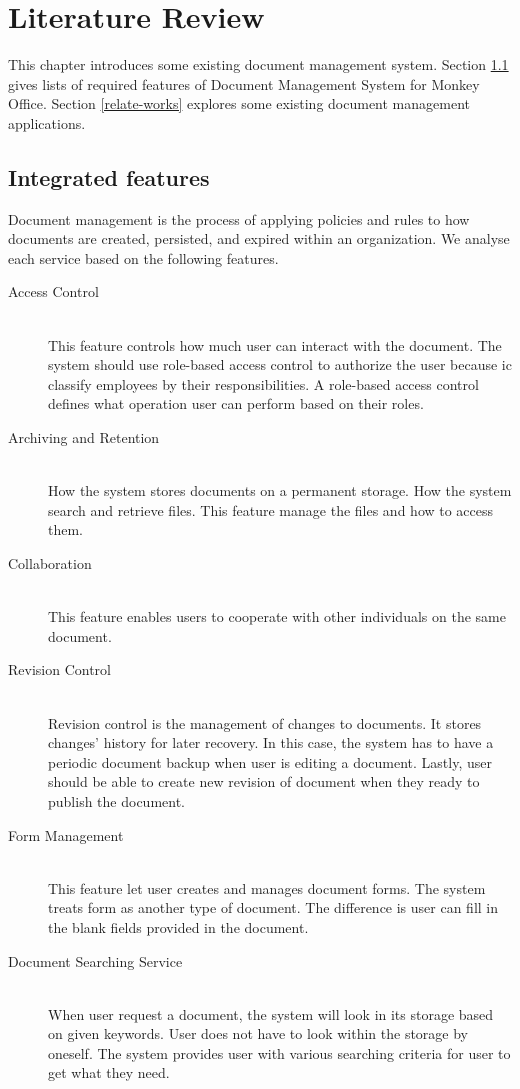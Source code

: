 \chapter{Literature Review}
This chapter introduces some existing document management system.
Section \ref{dms-features} gives lists of required features of Document Management System for Monkey Office.
Section \ref{relate-works} explores some existing document management applications.

\section{Integrated features} \label{dms-features}
Document management is the process of applying policies and rules to how documents are created, persisted, and expired within an organization.
We analyse each service based on the following features.

\begin{description}
\item[Access Control] \hfill \\
This feature controls how much user can interact with the document.
The system should use role-based access control to authorize the user because \gls{ic} classify employees by their responsibilities.
A role-based access control defines what operation user can perform based on their roles.

\item[Archiving and Retention] \hfill \\
How the system stores documents on a permanent storage.
How the system search and retrieve files.
This feature manage the files and how to access them.

\item[Collaboration] \hfill \\
This feature enables users to cooperate with other individuals on the same document. 


\item[Revision Control] \hfill \\
Revision control is the management of changes to documents.
It stores changes' history for later recovery.
In this case, the system has to have a periodic document backup when user is editing a document.
Lastly, user should be able to create new revision of document when they ready to publish the document.

\item[Form Management] \hfill \\
This feature let user creates and manages document forms.
The system treats form as another type of document.
The difference is user can fill in the blank fields provided in the document.

\item[Document Searching Service] \hfill \\
When user request a document, the system will look in its storage based on given keywords.
User does not have to look within the storage by oneself.
The system provides user with various searching criteria for user to get what they need.
\end{description}

